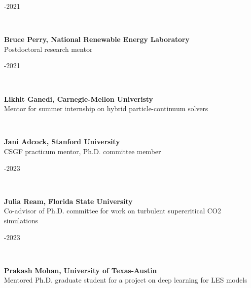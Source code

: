 \documentclass[11pt,letterpaper]{article}
\begin{document}
\begin{minipage}[t]{0.15\textwidth}-2021%
\end{minipage}\\[2ex]%
\begin{minipage}[t]{0.82\textwidth}%
  \textbf{Bruce Perry, National Renewable Energy Laboratory}\\%
  Postdoctoral research mentor%
\end{minipage}\hfill%
\begin{minipage}[t]{0.15\textwidth}-2021%
\end{minipage}\\[2ex]%
\begin{minipage}[t]{0.82\textwidth}%
  \textbf{Likhit Ganedi, Carnegie-Mellon Univeristy}\\%
  Mentor for summer internship on hybrid particle-continuum solvers%
\end{minipage}\hfill%
\begin{minipage}[t]{0.15\textwidth}%
\end{minipage}\\[2ex]%
\begin{minipage}[t]{0.82\textwidth}%
  \textbf{Jani Adcock, Stanford University}\\%
  CSGF practicum mentor, Ph.D. committee member%
\end{minipage}\hfill%
\begin{minipage}[t]{0.15\textwidth}-2023%
\end{minipage}\\[2ex]%
\begin{minipage}[t]{0.82\textwidth}%
  \textbf{Julia Ream, Florida State University}\\%
  Co-advisor of Ph.D. committee for work on turbulent supercritical CO2 simulations%
\end{minipage}\hfill%
\begin{minipage}[t]{0.15\textwidth}-2023%
\end{minipage}\\[2ex]%
\begin{minipage}[t]{0.82\textwidth}%
  \textbf{Prakash Mohan, University of Texas-Austin}\\%
  Mentored Ph.D. graduate student for a project on deep learning for LES models%
\end{minipage}\hfill%
\begin{minipage}[t]{0.15\textwidth}%
\end{minipage}\\[2ex]%
\end{document}
